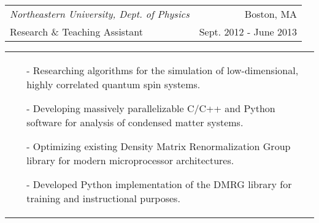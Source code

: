 \begin{tabularx}{\textwidth}{ L R }
  \textit{Northeastern University, Dept. of Physics} & Boston, MA \\
  Research \& Teaching Assistant & Sept. 2012 - June 2013 \\
\end{tabularx}
\begin{tabularx}{\textwidth}{ X }
  \begin{itemize}
    \itemsep{}
    \item[-] Researching algorithms for the simulation of low-dimensional, highly correlated quantum spin systems.
    \item[-] Developing massively parallelizable C/C++ and Python software for analysis of condensed matter systems.
    \item[-] Optimizing existing Density Matrix Renormalization Group library for modern microprocessor architectures.
    \item[-] Developed Python implementation of the DMRG library for training and instructional purposes.
  \end{itemize}
\end{tabularx}
